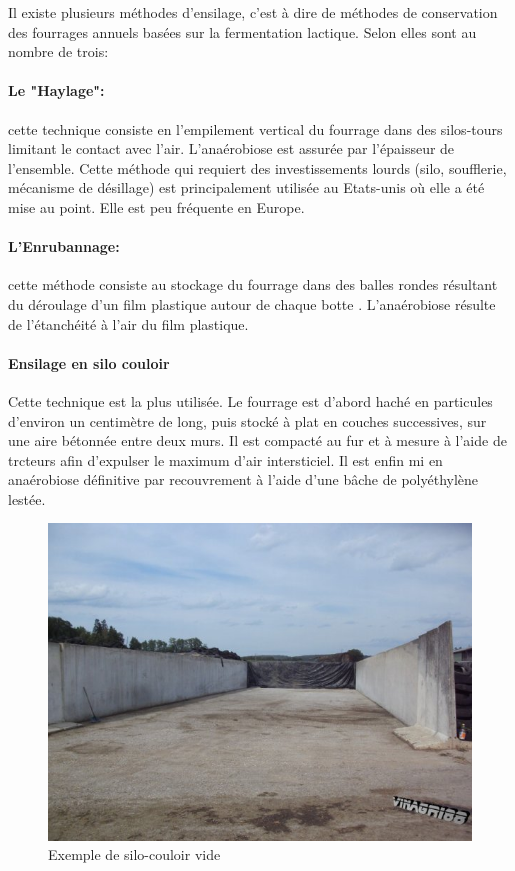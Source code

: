 \documentclass[12pt,a4paper]{report}
\begin{document}
Il existe plusieurs méthodes d'ensilage, c'est à dire de méthodes de conservation des fourrages annuels basées sur la fermentation lactique. Selon \cite{wikipedia_ensilage_2018} elles sont au nombre de trois:

\paragraph{Le "Haylage":} cette technique  consiste en l'empilement vertical du fourrage dans des silos-tours limitant le contact avec l'air. L'anaérobiose est assurée par l'épaisseur de l'ensemble.
Cette méthode qui requiert des investissements lourds (silo, soufflerie, mécanisme de désillage) est principalement utilisée au Etats-unis où elle a été mise au point. Elle est peu fréquente en Europe.

\paragraph{L'Enrubannage:} cette méthode consiste au stockage du fourrage dans des balles rondes résultant du déroulage d'un film plastique autour de chaque botte . L'anaérobiose résulte de l'étanchéité à l'air du film plastique.


\paragraph{Ensilage en silo couloir} Cette technique est la plus utilisée. Le fourrage est d'abord haché en particules d'environ un centimètre de long, puis stocké à plat en couches successives, sur une aire bétonnée entre deux murs. Il est compacté au fur et à mesure à l'aide de trcteurs afin d'expulser le maximum d'air intersticiel. Il est enfin mi en anaérobiose définitive par recouvrement à l'aide d'une bâche de polyéthylène lestée.

\begin{figure}[H]
	\centering
	\includegraphics[width=0.7\linewidth]{img/silocouloir}
	\caption{Exemple de silo-couloir vide}
	\label{fig:silocouloir}
\end{figure}
\end{document}
